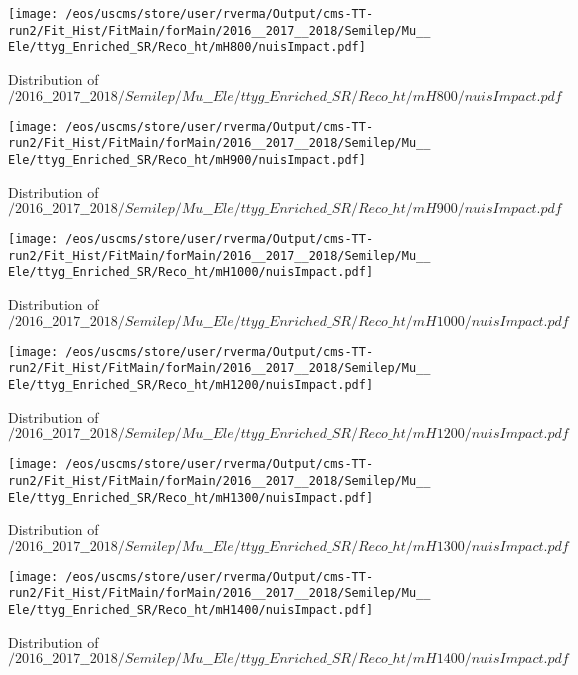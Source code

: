 \begin{figure}
\centering
\texttt{[image: /eos/uscms/store/user/rverma/Output/cms-TT-run2/Fit\_Hist/FitMain/forMain/2016\_\_2017\_\_2018/Semilep/Mu\_\_Ele/ttyg\_Enriched\_SR/Reco\_ht/mH800/nuisImpact.pdf]}
\caption{Distribution of $/2016\_\_2017\_\_2018/Semilep/Mu\_\_Ele/ttyg\_Enriched\_SR/Reco\_ht/mH800/nuisImpact.pdf$}
\end{figure}

\begin{figure}
\centering
\texttt{[image: /eos/uscms/store/user/rverma/Output/cms-TT-run2/Fit\_Hist/FitMain/forMain/2016\_\_2017\_\_2018/Semilep/Mu\_\_Ele/ttyg\_Enriched\_SR/Reco\_ht/mH900/nuisImpact.pdf]}
\caption{Distribution of $/2016\_\_2017\_\_2018/Semilep/Mu\_\_Ele/ttyg\_Enriched\_SR/Reco\_ht/mH900/nuisImpact.pdf$}
\end{figure}

\begin{figure}
\centering
\texttt{[image: /eos/uscms/store/user/rverma/Output/cms-TT-run2/Fit\_Hist/FitMain/forMain/2016\_\_2017\_\_2018/Semilep/Mu\_\_Ele/ttyg\_Enriched\_SR/Reco\_ht/mH1000/nuisImpact.pdf]}
\caption{Distribution of $/2016\_\_2017\_\_2018/Semilep/Mu\_\_Ele/ttyg\_Enriched\_SR/Reco\_ht/mH1000/nuisImpact.pdf$}
\end{figure}

\begin{figure}
\centering
\texttt{[image: /eos/uscms/store/user/rverma/Output/cms-TT-run2/Fit\_Hist/FitMain/forMain/2016\_\_2017\_\_2018/Semilep/Mu\_\_Ele/ttyg\_Enriched\_SR/Reco\_ht/mH1200/nuisImpact.pdf]}
\caption{Distribution of $/2016\_\_2017\_\_2018/Semilep/Mu\_\_Ele/ttyg\_Enriched\_SR/Reco\_ht/mH1200/nuisImpact.pdf$}
\end{figure}

\begin{figure}
\centering
\texttt{[image: /eos/uscms/store/user/rverma/Output/cms-TT-run2/Fit\_Hist/FitMain/forMain/2016\_\_2017\_\_2018/Semilep/Mu\_\_Ele/ttyg\_Enriched\_SR/Reco\_ht/mH1300/nuisImpact.pdf]}
\caption{Distribution of $/2016\_\_2017\_\_2018/Semilep/Mu\_\_Ele/ttyg\_Enriched\_SR/Reco\_ht/mH1300/nuisImpact.pdf$}
\end{figure}

\begin{figure}
\centering
\texttt{[image: /eos/uscms/store/user/rverma/Output/cms-TT-run2/Fit\_Hist/FitMain/forMain/2016\_\_2017\_\_2018/Semilep/Mu\_\_Ele/ttyg\_Enriched\_SR/Reco\_ht/mH1400/nuisImpact.pdf]}
\caption{Distribution of $/2016\_\_2017\_\_2018/Semilep/Mu\_\_Ele/ttyg\_Enriched\_SR/Reco\_ht/mH1400/nuisImpact.pdf$}
\end{figure}

